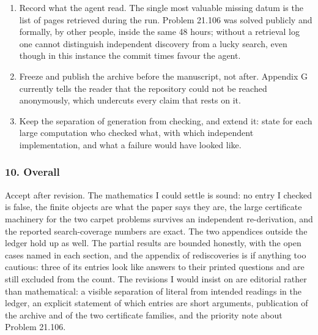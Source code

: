 \begin{enumerate}
\def\labelenumi{\arabic{enumi}.}
\setcounter{enumi}{5}
\tightlist
\item
  Record what the agent read. The single most valuable missing datum is
  the list of pages retrieved during the run. Problem 21.106 was solved
  publicly and formally, by other people, inside the same 48 hours;
  without a retrieval log one cannot distinguish independent discovery
  from a lucky search, even though in this instance the commit times
  favour the agent.
\item
  Freeze and publish the archive before the manuscript, not after.
  Appendix G currently tells the reader that the repository could not be
  reached anonymously, which undercuts every claim that rests on it.
\item
  Keep the separation of generation from checking, and extend it: state
  for each large computation who checked what, with which independent
  implementation, and what a failure would have looked like.
\end{enumerate}

\hypertarget{review-md-overall}{%
\subsubsection*{10. Overall}\label{review-md-overall}}

Accept after revision. The mathematics I could settle is sound: no entry
I checked is false, the finite objects are what the paper says they are,
the large certificate machinery for the two carpet problems survives an
independent re-derivation, and the reported search-coverage numbers are
exact. The two appendices outside the ledger hold up as well. The
partial results are bounded honestly, with the open cases named in each
section, and the appendix of rediscoveries is if anything too cautious:
three of its entries look like answers to their printed questions and
are still excluded from the count. The revisions I would insist on are
editorial rather than mathematical: a visible separation of literal from
intended readings in the ledger, an explicit statement of which entries
are short arguments, publication of the archive and of the two
certificate families, and the priority note about Problem 21.106.
